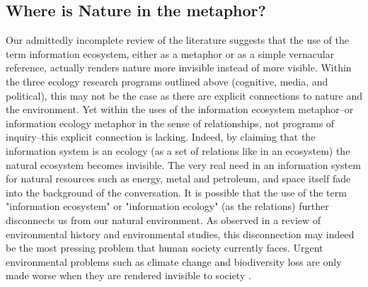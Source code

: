 \subsection{Where is Nature in the metaphor?}

Our admittedly incomplete review of the literature suggests that the use of the term information ecosystem, either as a metaphor or as a simple vernacular reference, actually renders nature more invisible instead of more visible. Within the three ecology research programs outlined above (cognitive, media, and political), this may not be the case as there are explicit connections to nature and the environment. Yet within the uses of the information ecosystem metaphor--or information ecology metaphor in the sense of relationships, not programs of inquiry--this explicit connection is lacking. Indeed, by claiming that the information system is an ecology (as a set of relations like in an ecosystem) the natural ecosystem becomes invisible. The very real need in an information system for natural resources such as energy, metal and petroleum, and space itself fade into the background of the conversation. It is possible that the use of the term "information ecosystem" or "information ecology" (as the relations) further disconnects us from our natural environment.  As observed in a review of environmental history and environmental studies, this disconnection may indeed be the most pressing problem that human society currently faces. Urgent environmental problems such as climate change and biodiversity loss are only made worse when they are rendered invisible to society \citep{worthy_2013}.
